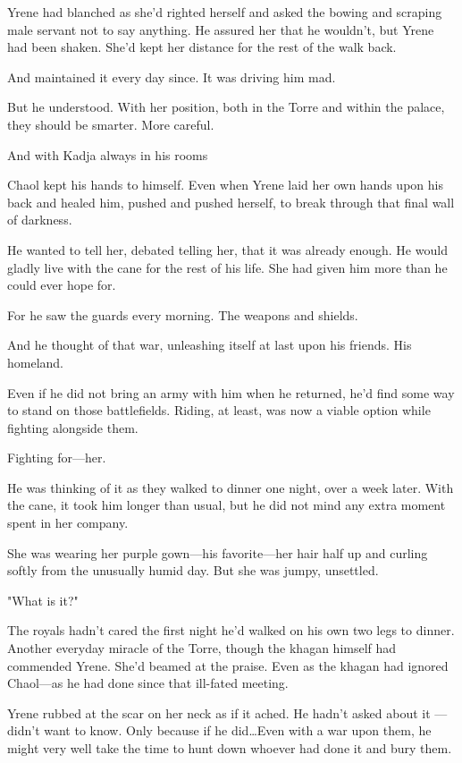 Yrene had blanched as she'd righted herself and asked the bowing and scraping male servant not to say anything.
He assured her that he wouldn't, but Yrene had been shaken.
She'd kept her distance for the rest of the walk back.

And maintained it every day since.
It was driving him mad.

But he understood.
With her position, both in the Torre and within the palace, they should be smarter.
More careful.

And with Kadja always in his rooms 

Chaol kept his hands to himself.
Even when Yrene laid her own hands upon his back and healed him, pushed and pushed herself, to break through that final wall of darkness.

He wanted to tell her, debated telling her, that it was already enough.
He would gladly live with the cane for the rest of his life.
She had given him more than he could ever hope for.

For he saw the guards every morning.
The weapons and shields.

And he thought of that war, unleashing itself at last upon his friends.
His homeland.

Even if he did not bring an army with him when he returned, he'd find some way to stand on those battlefields.
Riding, at least, was now a viable option while fighting alongside them.

Fighting for---her.

He was thinking of it as they walked to dinner one night, over a week later.
With the cane, it took him longer than usual, but he did not mind any extra moment spent in her company.

She was wearing her purple gown---his favorite---her hair half up and curling softly from the unusually humid day.
But she was jumpy, unsettled.

"What is it?"

The royals hadn't cared the first night he'd walked on his own two legs to dinner.
Another everyday miracle of the Torre, though the khagan himself had commended Yrene.
She'd beamed at the praise.
Even as the khagan had ignored Chaol---as he had done since that ill-fated meeting.

Yrene rubbed at the scar on her neck as if it ached.
He hadn't asked about it ---didn't want to know.
Only because if he did\ldots Even with a war upon them, he might very well take the time to hunt down whoever had done it and bury them.

